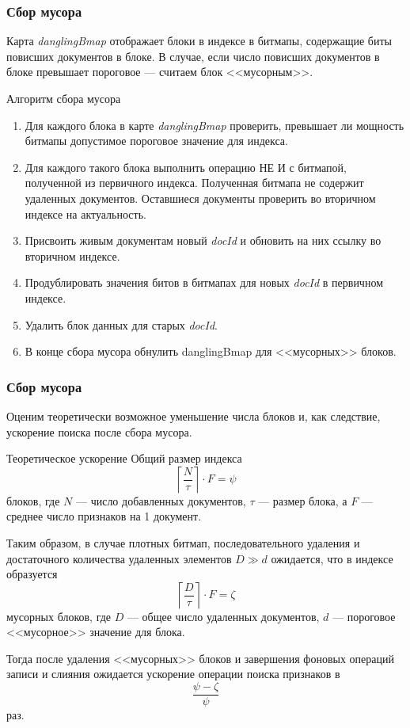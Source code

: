 \documentclass[aspectratio=169, pdf, 8pt, unicode]{beamer}
\begin{document}
\begin{frame}[fragile]
\frametitle{Сбор мусора}

Карта \textit{danglingBmap} отображает блоки в индексе в битмапы,
содержащие биты повисших документов в блоке. В случае, если число повисших документов в блоке превышает пороговое — считаем блок <<мусорным>>.

\begin{block}{Алгоритм сбора мусора}
    \begin{enumerate}
        \item Для каждого блока в карте \textit{danglingBmap} проверить, превышает ли мощность битмапы допустимое пороговое значение для индекса.
        \item Для каждого такого блока выполнить операцию НЕ И с битмапой, полученной из первичного индекса. Полученная битмапа не содержит удаленных документов. Оставшиеся документы проверить во вторичном индексе на актуальность.
        \item Присвоить живым документам новый \textit{docId} и обновить на них ссылку во вторичном индексе.
        \item Продублировать значения битов в битмапах для новых \textit{docId} в первичном индексе.
        \item Удалить блок данных для старых \textit{docId}.
        \item В конце сбора мусора обнулить danglingBmap для <<мусорных>> блоков.
    \end{enumerate}
\end{block}
\end{frame}

\begin{frame}[fragile]
\frametitle{Сбор мусора}

Оценим теоретически возможное уменьшение числа блоков и, как следствие, ускорение поиска после сбора мусора.

\begin{block}{Теоретическое ускорение}
    Общий размер индекса
    \begin{equation}
        \left\lceil\frac{N}{\tau}\right\rceil \cdot F = \psi
    \end{equation}
    блоков, где $N$ — число добавленных документов, $\tau$ — размер блока, а
    $F$ — среднее число признаков на 1 документ.

    Таким образом, в случае плотных битмап, последовательного удаления и достаточного количества удаленных элементов $D \gg d$ ожидается, что в индексе образуется
    \begin{equation}
        \left\lceil\frac{D}{\tau}\right\rceil \cdot F = \zeta
    \end{equation}
    мусорных блоков, где $D$ — общее число удаленных документов, $d$ — пороговое <<мусорное>> значение для блока.

    Тогда после удаления <<мусорных>> блоков и завершения фоновых операций
    записи и слияния ожидается ускорение операции поиска признаков в 
    \begin{equation}
        \frac{\psi - \zeta}{\psi}
    \end{equation}
    раз.
\end{block}
\end{frame}
\end{document}
